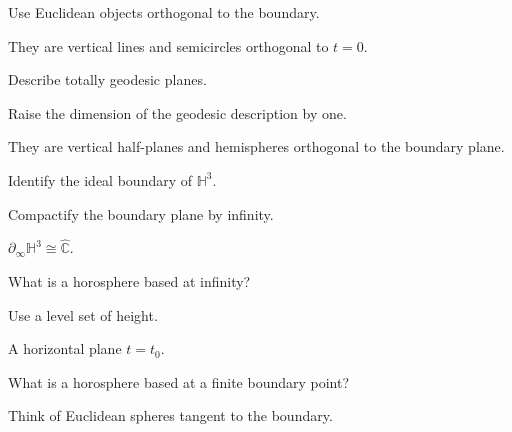 \begin{hint}
Use Euclidean objects orthogonal to the boundary.
\end{hint}

\begin{solution}
They are vertical lines and semicircles orthogonal to \(t=0\).
\end{solution}

\begin{exercise}\label{exr:vii36-05}
Describe totally geodesic planes.
\end{exercise}

\begin{hint}
Raise the dimension of the geodesic description by one.
\end{hint}

\begin{solution}
They are vertical half-planes and hemispheres orthogonal to the boundary plane.
\end{solution}

\begin{exercise}\label{exr:vii36-06}
Identify the ideal boundary of \(\mathbb H^3\).
\end{exercise}

\begin{hint}
Compactify the boundary plane by infinity.
\end{hint}

\begin{solution}
\(\partial_\infty\mathbb H^3\cong\widehat{\mathbb C}\).
\end{solution}

\begin{exercise}\label{exr:vii36-07}
What is a horosphere based at infinity?
\end{exercise}

\begin{hint}
Use a level set of height.
\end{hint}

\begin{solution}
A horizontal plane \(t=t_0\).
\end{solution}

\begin{exercise}\label{exr:vii36-08}
What is a horosphere based at a finite boundary point?
\end{exercise}

\begin{hint}
Think of Euclidean spheres tangent to the boundary.
\end{hint}

